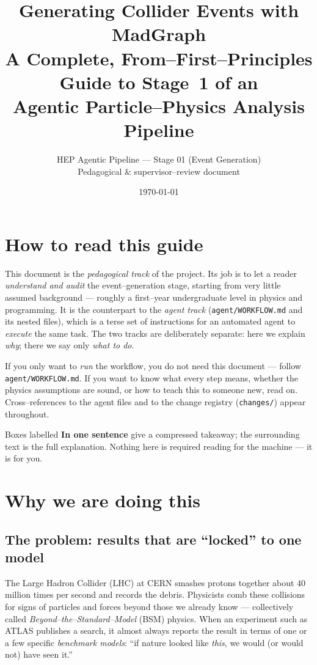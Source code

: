\documentclass[11pt,oneside]{report}
\title{\textbf{Generating Collider Events with MadGraph}\\[4pt]
\large A Complete, From--First--Principles Guide to Stage~1 of an\\
Agentic Particle--Physics Analysis Pipeline}
\author{HEP Agentic Pipeline --- Stage 01 (Event Generation)\\
\small Pedagogical \& supervisor--review document}
\date{\today}
\newcommand{\code}[1]{\texttt{#1}}
\begin{document}
\maketitle
\tableofcontents

\chapter*{How to read this guide}
This document is the \emph{pedagogical track} of the project. Its job is to let a reader
\emph{understand and audit} the event--generation stage, starting from very little assumed
background --- roughly a first--year undergraduate level in physics and programming. It is the
counterpart to the \emph{agent track} (\code{agent/WORKFLOW.md} and its nested files), which is a
terse set of instructions for an automated agent to \emph{execute} the same task. The two tracks
are deliberately separate: here we explain \emph{why}; there we say only \emph{what to do}.

If you only want to \emph{run} the workflow, you do not need this document --- follow
\code{agent/WORKFLOW.md}. If you want to know what every step means, whether the physics
assumptions are sound, or how to teach this to someone new, read on. Cross--references to the
agent files and to the change registry (\code{changes/}) appear throughout.

Boxes labelled \textbf{In one sentence} give a compressed takeaway; the surrounding text is the
full explanation. Nothing here is required reading for the machine --- it is for you.

\chapter{Why we are doing this}
\label{ch:why}

\section{The problem: results that are ``locked'' to one model}
The Large Hadron Collider (LHC) at CERN smashes protons together about 40 million times per
second and records the debris. Physicists comb these collisions for signs of particles and forces
beyond those we already know --- collectively called \emph{Beyond--the--Standard--Model} (BSM)
physics. When an experiment such as ATLAS publishes a search, it almost always reports the result
in terms of one or a few specific \emph{benchmark models}: ``if nature looked like \emph{this},
we would (or would not) have seen it.''
\end{document}
